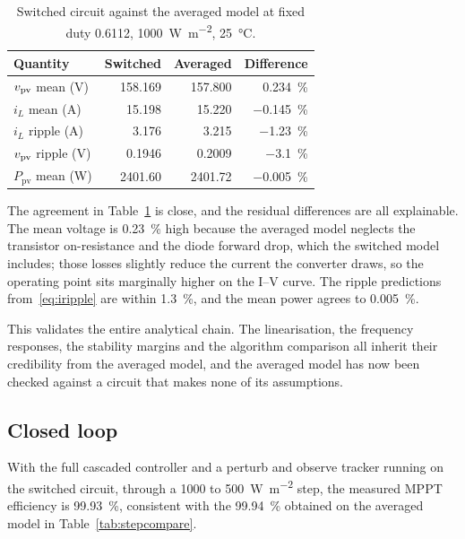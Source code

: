 \begin{table}[htbp]
\centering
\caption{Switched circuit against the averaged model at fixed duty \num{0.6112}, \SI{1000}{\watt\per\square\metre}, \SI{25}{\celsius}.}
\label{tab:swvalid}
\begin{tabular}{@{}lrrr@{}}
\toprule
\textbf{Quantity} & \textbf{Switched} & \textbf{Averaged} & \textbf{Difference} \\
\midrule
$v_{\mathrm{pv}}$ mean (\si{\volt})            & 158.169 & 157.800 & \SI{+0.234}{\percent} \\
$i_L$ mean (\si{\ampere})           & 15.198  & 15.220  & \SI{-0.145}{\percent} \\
$i_L$ ripple (\si{\ampere})         & 3.176   & 3.215   & \SI{-1.23}{\percent} \\
$v_{\mathrm{pv}}$ ripple (\si{\volt})          & 0.1946  & 0.2009  & \SI{-3.1}{\percent} \\
$P_{\mathrm{pv}}$ mean (\si{\watt}) & 2401.60 & 2401.72 & \SI{-0.005}{\percent} \\
\bottomrule
\end{tabular}
\end{table}

The agreement in Table~\ref{tab:swvalid} is close, and the residual differences
are all explainable. The mean voltage is \SI{0.23}{\percent} high because the
averaged model neglects the transistor on-resistance and the diode forward drop,
which the switched model includes; those losses slightly reduce the current the
converter draws, so the operating point sits marginally higher on the I--V
curve. The ripple predictions from~\eqref{eq:iripple} are within
\SI{1.3}{\percent}, and the mean power agrees to \SI{0.005}{\percent}.

This validates the entire analytical chain. The linearisation, the frequency
responses, the stability margins and the algorithm comparison all inherit their
credibility from the averaged model, and the averaged model has now been checked
against a circuit that makes none of its assumptions.

\subsection{Closed loop}

With the full cascaded controller and a perturb and observe tracker running on
the switched circuit, through a \SI{1000}{} to \SI{500}{\watt\per\square\metre}
step, the measured MPPT efficiency is \SI{99.93}{\percent}, consistent with the
\SI{99.94}{\percent} obtained on the averaged model in
Table~\ref{tab:stepcompare}.


